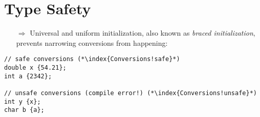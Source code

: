 \documentclass[10pt]{book}
\begin{document}
\section{Type Safety}
\begin{enumerate}
\item[$\Rightarrow$] Universal and uniform initialization, also known as \emph{braced initialization}, prevents narrowing conversions from happening:
\end{enumerate}
\begin{lstlisting}
// safe conversions (*\index{Conversions!safe}*)
double x {54.21};
int a {2342};

// unsafe conversions (compile error!) (*\index{Conversions!unsafe}*)
int y {x};
char b {a};
\end{lstlisting}
%
%
\end{document}
